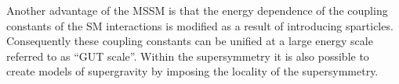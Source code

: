 

Another advantage of the MSSM is that the energy dependence of the coupling constants of the SM interactions is modified as a result of introducing sparticles. Consequently these coupling constants can be unified at a large energy scale referred to as ``GUT scale''. Within the supersymmetry it is also possible to create models of supergravity by imposing the locality of the supersymmetry.






